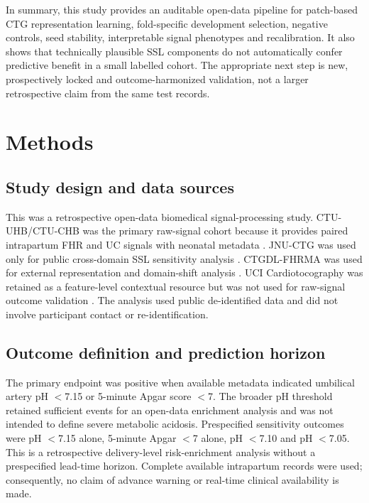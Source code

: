 \documentclass[utf8]{FrontiersinHarvard}
\begin{document}
In summary, this study provides an auditable open-data pipeline for patch-based CTG representation learning, fold-specific development selection, negative controls, seed stability, interpretable signal phenotypes and recalibration. It also shows that technically plausible SSL components do not automatically confer predictive benefit in a small labelled cohort. The appropriate next step is new, prospectively locked and outcome-harmonized validation, not a larger retrospective claim from the same test records.

\section{Methods}

\subsection{Study design and data sources}

This was a retrospective open-data biomedical signal-processing study. CTU-UHB/CTU-CHB was the primary raw-signal cohort because it provides paired intrapartum FHR and UC signals with neonatal metadata \citep{goldberger2000,chudacek2014,ctuuhb}. JNU-CTG was used only for public cross-domain SSL sensitivity analysis \citep{bai2026jnuctg}. CTGDL-FHRMA was used for external representation and domain-shift analysis \citep{ctgdl}. UCI Cardiotocography was retained as a feature-level contextual resource but was not used for raw-signal outcome validation \citep{uci}. The analysis used public de-identified data and did not involve participant contact or re-identification.

\subsection{Outcome definition and prediction horizon}

The primary endpoint was positive when available metadata indicated umbilical artery pH $<$7.15 or 5-minute Apgar score $<$7. The broader pH threshold retained sufficient events for an open-data enrichment analysis and was not intended to define severe metabolic acidosis. Prespecified sensitivity outcomes were pH $<$7.15 alone, 5-minute Apgar $<$7 alone, pH $<$7.10 and pH $<$7.05. This is a retrospective delivery-level risk-enrichment analysis without a prespecified lead-time horizon. Complete available intrapartum records were used; consequently, no claim of advance warning or real-time clinical availability is made.
\end{document}
